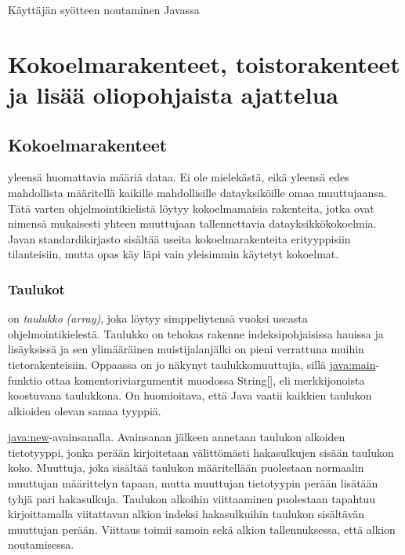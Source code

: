\documentclass{tufte-book}
\newcommand{\eng}[1]{\textit{(#1)}}
\newcommand{\new}[1]{\textit{\gls{#1}}}
\newcommand{\neweng}[2]{\new{#1} \eng{#2}}
\newcommand{\java}[1]{\underline{\gls{java:#1}}}
\newcommand{\code}[3]{
\begin{listing}
    \inputminted{java}{OhjelmointiopasEsimerkit/src/#1/#2.java}
    \caption{#3}
    \label{Java-#1-#2}
\end{listing}
}
\begin{document}
\code{week2}{BasicUserInput}{Käyttäjän syötteen noutaminen Javassa}


\chapter{Kokoelmarakenteet, toistorakenteet ja lisää oliopohjaista ajattelua}
\label{perusteet2}


\section{Kokoelmarakenteet}
\label{kokoelmista}

 yleensä huomattavia määriä dataa. Ei ole mielekästä, eikä
yleensä edes mahdollista määritellä kaikille mahdollisille datayksiköille omaa muuttujaansa.
Tätä varten ohjelmointikielistä löytyy kokoelmamaisia rakenteita, jotka ovat nimensä mukaisesti
yhteen muuttujaan tallennettavia datayksikkökokoelmia. Javan standardikirjasto sisältää useita
kokoelmarakenteita erityyppisiin tilanteisiin, mutta opas käy läpi vain yleisimmin käytetyt
kokoelmat.

\subsection{Taulukot}
\label{taulukot}

 on \neweng{taulukko}{array}, joka löytyy
simppeliytensä vuoksi useasta ohjelmointikielestä. Taulukko on tehokas rakenne indeksipohjaisissa
hauissa ja lisäyksissä ja sen ylimääräinen muistijalanjälki on pieni verrattuna muihin
tietorakenteisiin. Oppaassa on jo näkynyt taulukkomuuttujia, sillä \java{main}-funktio ottaa
komentoriviargumentit muodossa String[], eli merkkijonoista koostuvana taulukkona. On huomioitava,
että Java vaatii kaikkien taulukon alkioiden olevan samaa tyyppiä.

 \java{new}-avainsanalla. Avainsanan jälkeen annetaan taulukon
alkoiden tietotyyppi, jonka perään kirjoitetaan välittömästi hakasulkujen sisään taulukon koko.
Muuttuja, joka sisältää taulukon määritellään puolestaan normaalin muuttujan määrittelyn tapaan,
mutta muuttujan tietotyypin perään lisätään tyhjä pari hakasulkuja. Taulukon alkoihin viittaaminen
puolestaan tapahtuu kirjoittamalla viitattavan alkion indeksi hakasulkuihin taulukon sisältävän
muuttujan perään. Viittaus toimii samoin sekä alkion tallennuksessa, että alkion noutamisessa.
\end{document}
